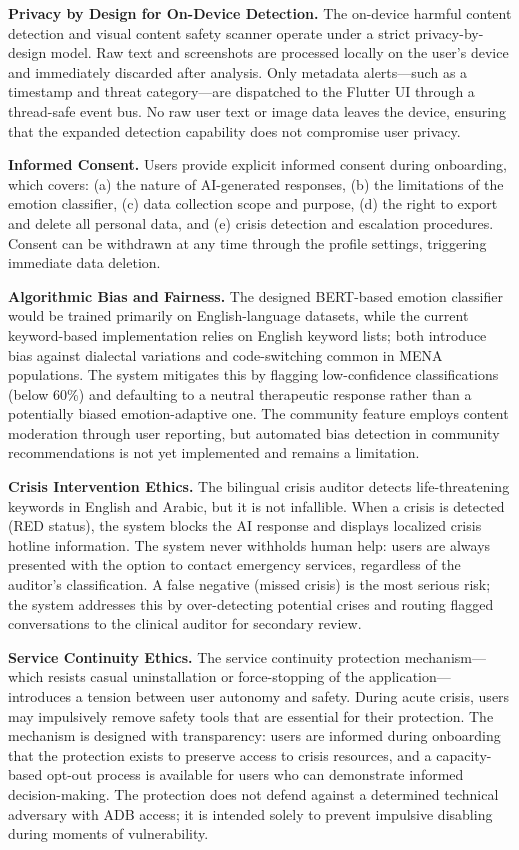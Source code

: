 \documentclass[12pt,a4paper,oneside,openany]{report}
\begin{document}
\textbf{Privacy by Design for On-Device Detection.} The on-device harmful content detection and visual content safety scanner operate under a strict privacy-by-design model. Raw text and screenshots are processed locally on the user's device and immediately discarded after analysis. Only metadata alerts---such as a timestamp and threat category---are dispatched to the Flutter UI through a thread-safe event bus. No raw user text or image data leaves the device, ensuring that the expanded detection capability does not compromise user privacy.

\textbf{Informed Consent.} Users provide explicit informed consent during onboarding, which covers: (a) the nature of AI-generated responses, (b) the limitations of the emotion classifier, (c) data collection scope and purpose, (d) the right to export and delete all personal data, and (e) crisis detection and escalation procedures. Consent can be withdrawn at any time through the profile settings, triggering immediate data deletion.

\textbf{Algorithmic Bias and Fairness.} The designed BERT-based emotion classifier would be trained primarily on English-language datasets, while the current keyword-based implementation relies on English keyword lists; both introduce bias against dialectal variations and code-switching common in MENA populations. The system mitigates this by flagging low-confidence classifications (below 60\%) and defaulting to a neutral therapeutic response rather than a potentially biased emotion-adaptive one. The community feature employs content moderation through user reporting, but automated bias detection in community recommendations is not yet implemented and remains a limitation.

\textbf{Crisis Intervention Ethics.} The bilingual crisis auditor detects life-threatening keywords in English and Arabic, but it is not infallible. When a crisis is detected (RED status), the system blocks the AI response and displays localized crisis hotline information. The system never withholds human help: users are always presented with the option to contact emergency services, regardless of the auditor's classification. A false negative (missed crisis) is the most serious risk; the system addresses this by over-detecting potential crises and routing flagged conversations to the clinical auditor for secondary review.

\textbf{Service Continuity Ethics.} The service continuity protection mechanism---which resists casual uninstallation or force-stopping of the application---introduces a tension between user autonomy and safety. During acute crisis, users may impulsively remove safety tools that are essential for their protection. The mechanism is designed with transparency: users are informed during onboarding that the protection exists to preserve access to crisis resources, and a capacity-based opt-out process is available for users who can demonstrate informed decision-making. The protection does not defend against a determined technical adversary with ADB access; it is intended solely to prevent impulsive disabling during moments of vulnerability.
\end{document}
